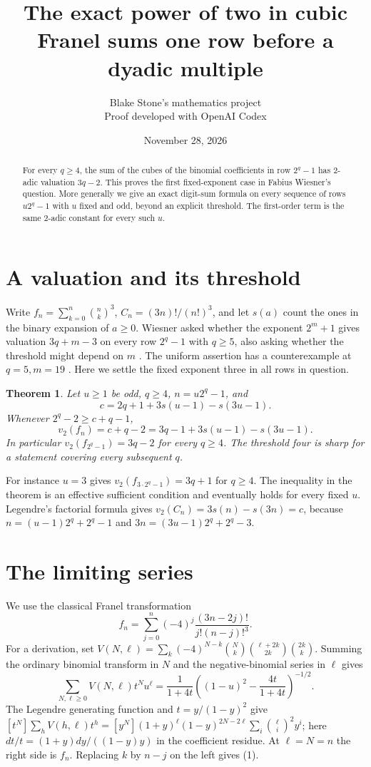 \documentclass[11pt]{article}
\title{The exact power of two in cubic Franel sums one row before a dyadic multiple}
\author{Blake Stone's mathematics project\\\small Proof developed with OpenAI Codex}
\date{November 28, 2026}
\newtheorem{theorem}{Theorem}
\newcommand{\ord}{v_2}
\begin{document}
\maketitle
\begin{abstract}
For every $q\ge4$, the sum of the cubes of the binomial coefficients in row $2^q-1$ has 2-adic valuation $3q-2$. This proves the first fixed-exponent case in Fabius Wiesner's question. More generally we give an exact digit-sum formula on every sequence of rows $u2^q-1$ with $u$ fixed and odd, beyond an explicit threshold. The first-order term is the same 2-adic constant for every such $u$.
\end{abstract}

\section{A valuation and its threshold}
Write $f_n=\sum_{k=0}^n\binom nk^3$, $C_n=(3n)!/(n!)^3$, and let $s(a)$ count the ones in the binary expansion of $a\ge0$.
Wiesner asked whether the exponent $2^m+1$ gives valuation $3q+m-3$ on every row $2^q-1$ with $q\ge5$, also asking whether the threshold might depend on $m$ \cite{wiesner}. The uniform assertion has a counterexample at $q=5,m=19$ \cite{rows}. Here we settle the fixed exponent three in all rows in question.
\begin{theorem}\label{main}
Let $u\ge1$ be odd, $q\ge4$, $n=u2^q-1$, and
\[
 c=2q+1+3s(u-1)-s(3u-1).
\]
Whenever $2^q-2\ge c+q-1$,
\[
 \ord(f_n)=c+q-2=3q-1+3s(u-1)-s(3u-1).
\]
In particular $\ord(f_{2^q-1})=3q-2$ for every $q\ge4$. The threshold four is sharp for a statement covering every subsequent $q$.
\end{theorem}
For instance $u=3$ gives $\ord(f_{3\cdot2^q-1})=3q+1$ for $q\ge4$. The inequality in the theorem is an effective sufficient condition and eventually holds for every fixed $u$. Legendre's factorial formula gives $\ord(C_n)=3s(n)-s(3n)=c$, because $n=(u-1)2^q+2^q-1$ and $3n=(3u-1)2^q+2^q-3$.

\section{The limiting series}
We use the classical Franel transformation \cite{oeis,companion}
\[
 f_n=\sum_{j=0}^n(-4)^j\frac{(3n-2j)!}{j!(n-j)!^3}.
 \tag{1}
\]
For a derivation, set $V(N,\ell)=\sum_k(-4)^{N-k}\binom Nk\binom{\ell+2k}{2k}\binom{2k}k$. Summing the ordinary binomial transform in $N$ and the negative-binomial series in $\ell$ gives
\[
 \sum_{N,\ell\ge0}V(N,\ell)t^Nu^\ell=
 \frac1{1+4t}\left((1-u)^2-\frac{4t}{1+4t}\right)^{-1/2}.
\]
The Legendre generating function and $t=y/(1-y)^2$ give
$[t^N]\sum_h V(h,\ell)t^h=[y^N](1+y)^\ell(1-y)^{2N-2\ell}
\sum_i\binom\ell i^2 y^i$; here $dt/t=(1+y)dy/((1-y)y)$ in the coefficient residue.
At $\ell=N=n$ the right side is $f_n$. Replacing $k$ by $n-j$ on the left gives (1).
\end{document}
